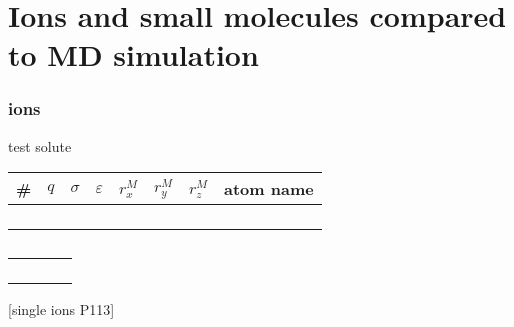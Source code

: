 
\chapter{Ions and small molecules compared to MD simulation\label{chpt:ions}}

\subsection{ions}

test solute

\begin{tabular}{|c|c|c|c|c|c|c|c|}
\hline 
\#  & $q$ & $\sigma$ & $\varepsilon$ & $r_{x}^{M}$ & $r_{y}^{M}$ & $r_{z}^{M}$ & atom name\tabularnewline
\hline 
\hline 
 &  &  &  &  &  &  & \tabularnewline
\hline 
 &  &  &  &  &  &  & \tabularnewline
\hline 
 &  &  &  &  &  &  & \tabularnewline
\hline 
 &  &  &  &  &  &  & \tabularnewline
\hline 
\end{tabular}

\begin{table}[h]
\begin{centering}
\begin{tabular*}{1\linewidth}{@{\extracolsep{\fill}}llll}
\toprule 
 &  &  & \tabularnewline
\midrule
 &  &  & \tabularnewline
 &  &  & \tabularnewline
 &  &  & \tabularnewline
 &  &  & \tabularnewline
\bottomrule
\end{tabular*}
\par\end{centering}
\caption[]{}
\end{table}

{[}single ions P113{]}

